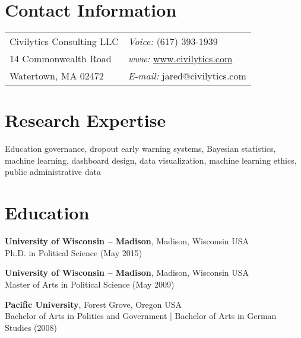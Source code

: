 \documentclass[margin,line]{res}
\begin{document}

\begin{resume}
\section{\sc Contact Information}
\vspace{.05in}
\begin{tabular}{@{}p{2.75in}p{2.75in}}
Civilytics Consulting LLC & {\it Voice:}  (617) 393-1939 \\            
14 Commonwealth Road & {\it www:} \url{www.civilytics.com} \\           
Watertown, MA 02472 & {\it E-mail:}  jared@civilytics.com\\       
\end{tabular}


\section{\sc Research Expertise}
Education governance, dropout early warning systems, Bayesian statistics, machine learning, 
dashboard design, data visualization, machine learning ethics, public administrative data

\section{\sc Education}
\vspace*{-0.15mm}
{\bf University of Wisconsin -- Madison}, Madison, Wisconsin USA \\
\vspace*{-0.15mm}
Ph.D. in Political Science (May 2015) 

{\bf University of Wisconsin -- Madison}, Madison, Wisconsin USA \\
\vspace*{-0.15mm}
Master of Arts in Political Science (May 2009)

{\bf Pacific University}, Forest Grove, Oregon USA \\
\vspace*{-0.15mm}
Bachelor of Arts in Politics and Government | Bachelor of Arts in German Studies (2008) \\


\end{resume}
\end{document}
